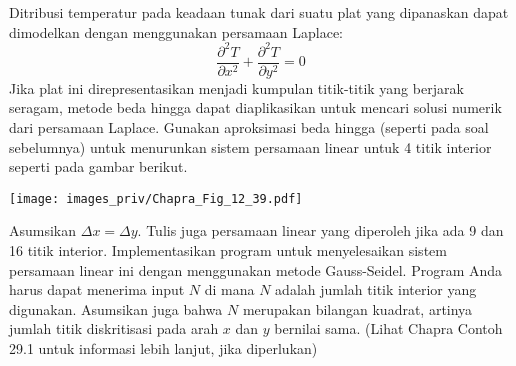 \begin{soal}
Ditribusi temperatur pada keadaan tunak dari suatu plat yang dipanaskan
dapat dimodelkan dengan menggunakan persamaan Laplace:
\begin{equation*}
\frac{\partial^2 T}{\partial x^2} + \frac{\partial^2 T}{\partial y^2} = 0
\end{equation*}
Jika plat ini direpresentasikan menjadi kumpulan titik-titik yang berjarak
seragam, metode beda hingga dapat diaplikasikan untuk mencari solusi numerik
dari persamaan Laplace. Gunakan aproksimasi beda hingga (seperti pada soal
sebelumnya) untuk menurunkan sistem persamaan linear untuk 4 titik interior
seperti pada gambar berikut.

{\centering
\texttt{[image: images\_priv/Chapra\_Fig\_12\_39.pdf]}
\par}

Asumsikan $\Delta x = \Delta y$. Tulis juga persamaan linear yang diperoleh
jika ada 9 dan 16 titik interior. 
Implementasikan program untuk menyelesaikan sistem persamaan linear
ini dengan menggunakan metode Gauss-Seidel. Program Anda harus dapat menerima input
$N$ di mana $N$ adalah jumlah titik interior yang digunakan. Asumsikan juga bahwa $N$
merupakan bilangan kuadrat, artinya jumlah titik diskritisasi pada arah $x$ dan $y$
bernilai sama.
(Lihat Chapra Contoh 29.1 untuk informasi lebih lanjut, jika diperlukan)
\end{soal}

